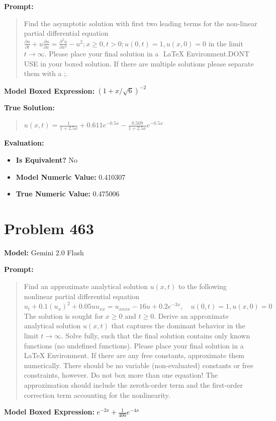\documentclass{article}
\begin{document}
\textbf{Prompt:}
\begin{quote}
Find the asymptotic solution with first two leading terms for the non-linear partial differential equation $\frac{\partial u}{\partial t} + u \frac{\partial u}{\partial x} = \frac{\partial^2 u}{\partial x^2} - u^2; x \geq 0, t > 0; u(0, t) = 1, u(x,0) = 0$ in the limit $t \rightarrow \infty$. Please place your final solution in a $\boxed{}$ LaTeX Environment.DONT USE \operatorname in your boxed solution. If there are multiple solutions please separate them with a ;.
\end{quote}
\textbf{Model Boxed Expression:} $(1+x/\sqrt{6})^{-2}$

\textbf{True Solution:}
\begin{quote}
$u(x,t) = \frac{1}{1 + 2.5x} + 0.611 e^{-0.5 x} - \frac{0.509}{1 + 2.5x} e^{-0.5 x}$
\end{quote}

\textbf{Evaluation:}
\begin{itemize}
\item \textbf{Is Equivalent?} No
\item \textbf{Model Numeric Value:} 0.410307
\item \textbf{True Numeric Value:} 0.475006
\end{itemize}
\vspace{1cm}
\section*{Problem 463}
\textbf{Model:} Gemini 2.0 Flash

\textbf{Prompt:}
\begin{quote}
Find an approximate analytical solution $u(x, t)$ to the following nonlinear partial differential equation $u_t +0.1(u_x)^2+0.05uu_{xx} = u_{xxxx}-16u+0.2e^{-3x}, \quad u(0,t)=1, u(x,0)=0 $ The solution is sought for $x \ge 0$ and $t \ge 0$. Derive an approximate analytical solution $u(x, t)$ that captures the dominant behavior in the limit $t \to \infty$. Solve fully, such that the final solution contains only known functions (no undefined functions). Please place your final solution in a \boxed{} LaTeX Environment. If there are any free constants, approximate them numerically. There should be no variable (non-evaluated) constants or free constraints, however. Do not box more than one equation! The approximation should include the zeroth-order term and the first-order correction term accounting for the nonlinearity.
\end{quote}
\textbf{Model Boxed Expression:} $e^{-2x}+\frac{1}{400}e^{-4x}$
\end{document}

